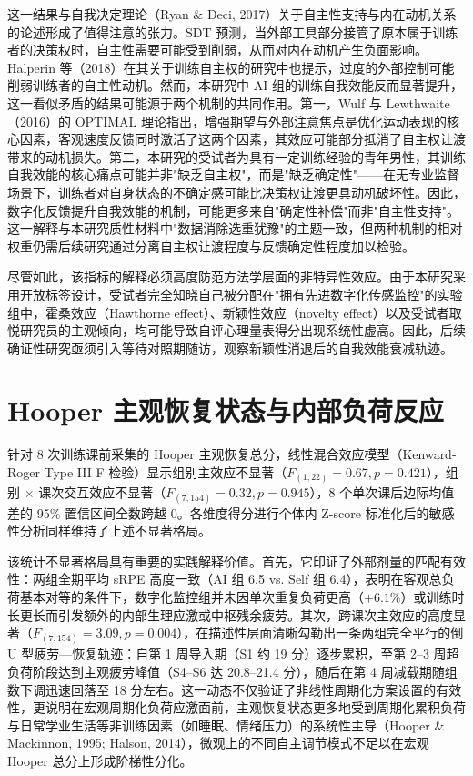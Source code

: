 \documentclass[UTF8,zihao=-4,twoside,openany]{ctexbook}
\begin{document}
这一结果与自我决定理论（Ryan \& Deci, 2017）关于自主性支持与内在动机关系的论述形成了值得注意的张力。SDT 预测，当外部工具部分接管了原本属于训练者的决策权时，自主性需要可能受到削弱，从而对内在动机产生负面影响。Halperin 等（2018）在其关于训练自主权的研究中也提示，过度的外部控制可能削弱训练者的自主性动机。然而，本研究中 AI 组的训练自我效能反而显著提升，这一看似矛盾的结果可能源于两个机制的共同作用。第一，Wulf 与 Lewthwaite（2016）的 OPTIMAL 理论指出，增强期望与外部注意焦点是优化运动表现的核心因素，客观速度反馈同时激活了这两个因素，其效应可能部分抵消了自主权让渡带来的动机损失。第二，本研究的受试者为具有一定训练经验的青年男性，其训练自我效能的核心痛点可能并非"缺乏自主权"，而是"缺乏确定性"——在无专业监督场景下，训练者对自身状态的不确定感可能比决策权让渡更具动机破坏性。因此，数字化反馈提升自我效能的机制，可能更多来自"确定性补偿"而非"自主性支持"。这一解释与本研究质性材料中"数据消除选重犹豫"的主题一致，但两种机制的相对权重仍需后续研究通过分离自主权让渡程度与反馈确定性程度加以检验。

尽管如此，该指标的解释必须高度防范方法学层面的非特异性效应。由于本研究采用开放标签设计，受试者完全知晓自己被分配在"拥有先进数字化传感监控"的实验组中，霍桑效应（Hawthorne effect）、新颖性效应（novelty effect）以及受试者取悦研究员的主观倾向，均可能导致自评心理量表得分出现系统性虚高。因此，后续确证性研究亟须引入等待对照期随访，观察新颖性消退后的自我效能衰减轨迹。

\section{Hooper 主观恢复状态与内部负荷反应}
针对 8 次训练课前采集的 Hooper 主观恢复总分，线性混合效应模型（Kenward-Roger Type III F 检验）显示组别主效应不显著（$F_{(1,22)}=0.67, p=0.421$），组别 $\times$ 课次交互效应不显著（$F_{(7,154)}=0.32, p=0.945$），8 个单次课后边际均值差的 95\% 置信区间全数跨越 0。各维度得分进行个体内 Z-score 标准化后的敏感性分析同样维持了上述不显著格局。

该统计不显著格局具有重要的实践解释价值。首先，它印证了外部剂量的匹配有效性：两组全期平均 sRPE 高度一致（AI 组 6.5 vs. Self 组 6.4），表明在客观总负荷基本对等的条件下，数字化监控组并未因单次重复负荷更高（$+6.1\%$）或训练时长更长而引发额外的内部生理应激或中枢残余疲劳。其次，跨课次主效应的高度显著（$F_{(7,154)}=3.09, p=0.004$），在描述性层面清晰勾勒出一条两组完全平行的倒 U 型疲劳—恢复轨迹：自第 1 周导入期（S1 约 19 分）逐步累积，至第 2--3 周超负荷阶段达到主观疲劳峰值（S4--S6 达 20.8--21.4 分），随后在第 4 周减载期随组数下调迅速回落至 18 分左右。这一动态不仅验证了非线性周期化方案设置的有效性，更说明在宏观周期化负荷应激面前，主观恢复状态更多地受到周期化累积负荷与日常学业生活等非训练因素（如睡眠、情绪压力）的系统性主导（Hooper \& Mackinnon, 1995; Halson, 2014），微观上的不同自主调节模式不足以在宏观 Hooper 总分上形成阶梯性分化。
\end{document}
